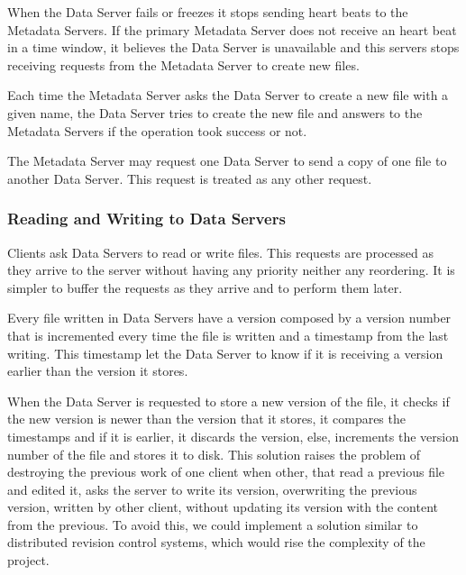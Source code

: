 When the Data Server fails or freezes it stops sending heart beats to
the Metadata Servers. If the primary Metadata Server does not receive an
heart beat in a time window, it believes the Data Server is unavailable
and this servers stops receiving requests from the Metadata Server to
create new files.

Each time the Metadata Server asks the Data Server to create a new file
with a given name, the Data Server tries to create the new file and answers
to the Metadata Servers if the operation took success or not.

The Metadata Server may request one Data Server to send a copy of one file
to another Data Server. This request is treated as any other request.

\subsubsection{Reading and Writing to Data Servers}

Clients ask Data Servers to read or write files. This requests are
processed as they arrive to the server without having any priority neither
any reordering. It is simpler to buffer the requests as they arrive and to
perform them later.

Every file written in Data Servers have a version composed by a version
number that is incremented every time the file is written and a timestamp
from the last writing. This timestamp let the Data Server to know if it is
receiving a version earlier than the version it stores.

When the Data Server is requested to store a new version of the file, it
checks if the new version is newer than the version that it stores, it
compares the timestamps and if it is earlier, it discards the version, else,
increments the version number of the file and stores it to disk.
This solution raises the problem of destroying the previous work of one
client when other, that read a previous file and edited it, asks the server
to write its version, overwriting the previous version, written by other
client, without updating its version with the content from the previous. To
avoid this, we could implement a solution similar to distributed revision
control systems, which would rise the complexity of the project.